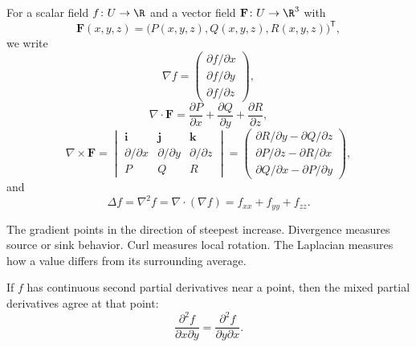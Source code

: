     \begin{definition}
        For a scalar field $f\colon U\to\R$ and a vector field
        $\mathbf{F}\colon U\to\R^3$ with
        \[
            \mathbf{F}(x,y,z)
            =
            \bigl(P(x,y,z),Q(x,y,z),R(x,y,z)\bigr)^{\mathsf T},
        \]
        we write
        \[
            \nabla f
            =
            \begin{pmatrix}
                \partial f/\partial x\\
                \partial f/\partial y\\
                \partial f/\partial z
            \end{pmatrix},
        \]
        \[
            \nabla\cdot\mathbf{F}
            =
            \frac{\partial P}{\partial x}
            +
            \frac{\partial Q}{\partial y}
            +
            \frac{\partial R}{\partial z},
        \]
        \[
            \nabla\times\mathbf{F}
            =
            \begin{vmatrix}
                \mathbf{i} & \mathbf{j} & \mathbf{k} \\
                \partial/\partial x & \partial/\partial y & \partial/\partial z \\
                P & Q & R
            \end{vmatrix}
            =
            \begin{pmatrix}
                \partial R/\partial y-\partial Q/\partial z\\
                \partial P/\partial z-\partial R/\partial x\\
                \partial Q/\partial x-\partial P/\partial y
            \end{pmatrix},
        \]
        and
        \[
            \Delta f
            =
            \nabla^2f
            =
            \nabla\cdot(\nabla f)
            =
            f_{xx}+f_{yy}+f_{zz}.
        \]
    \end{definition}

    \begin{idea}
        The gradient points in the direction of steepest increase. Divergence
        measures source or sink behavior. Curl measures local rotation. The
        Laplacian measures how a value differs from its surrounding average.
    \end{idea}

    \begin{theorem}
        If $f$ has continuous second partial derivatives near a point, then the
        mixed partial derivatives agree at that point:
        \[
            \frac{\partial^2 f}{\partial x\partial y}
            =
            \frac{\partial^2 f}{\partial y\partial x}.
        \]
    \end{theorem}

